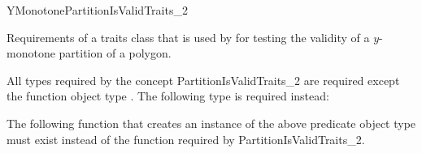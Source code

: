 

\begin{ccRefConcept}{YMonotonePartitionIsValidTraits_2}


\ccDefinition
  
Requirements of a traits class that is used 
by  for testing the validity of a
$y$-monotone partition of a polygon.

\ccTypes

All types required by the concept PartitionIsValidTraits\_2 are required
except the function object type . The following type is
required instead:


\ccOperations

The following function that creates an instance of the above predicate object
type must exist instead of the function  required by
PartitionIsValidTraits\_2.


\ccHasModels


\ccSeeAlso


\end{ccRefConcept}


